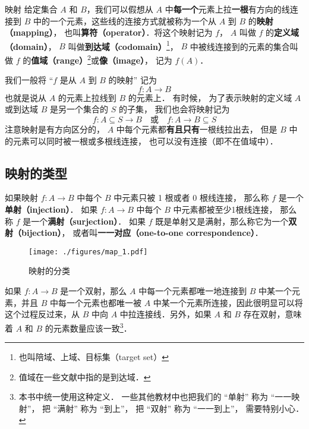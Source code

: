 

\begin{definition}{映射}
给定集合 $A$ 和 $B$，我们可以假想从 $A$ 中\textbf{每一个}元素上拉\textbf{一根}有方向的线连接到 $B$ 中的一个元素，这些线的连接方式就被称为一个从 $A$ 到 $B$ 的\textbf{映射（mapping）}， 也叫\textbf{算符（operator）}．将这个映射记为 $f$， $A$ 叫做 $f$ 的\textbf{定义域（domain）}， $B$ 叫做\textbf{到达域（codomain）}\footnote{也叫陪域、上域、目标集（target set）}， $B$ 中被线连接到的元素的集合叫做 $f$ 的\textbf{值域（range）}\footnote{值域在一些文献中指的是到达域．}或\textbf{像（image）}， 记为 $f(A)$．
\end{definition}

我们一般将 “$f$ 是从 $A$ 到 $B$ 的映射” 记为
\begin{equation}
f:A\to B
\end{equation}
也就是说从 $A$ 的元素上拉线到 $B$ 的元素上． 有时候， 为了表示映射的定义域 $A$ 或到达域 $B$ 是另一个集合的 $S$ 的子集， 我们也会将映射记为
\begin{equation}
f: A\subseteq S \to B \quad\text{或}\quad f: A \to B \subseteq S
\end{equation}
注意映射是有方向区分的， $A$ 中每个元素都\textbf{有且只有}一根线拉出去， 但是 $B$ 中的元素可以同时被一根或多根线连接， 也可以没有连接（即不在值域中）．

\subsection{映射的类型}
\begin{definition}{}\label{map_def1}
如果映射 $f:A \to B$ 中每个 $B$ 中元素只被 1 根或者 0 根线连接， 那么称 $f$ 是一个\textbf{单射（injection）}． 如果 $f:A\to B$ 中每个 $B$ 中元素都被至少1根线连接， 那么称 $f$ 是一个\textbf{满射（surjection）}． 如果 $f$ 既是单射又是满射，那么称它为一个\textbf{双射（bijection）}， 或者叫\textbf{一一对应（one-to-one correspondence）}．
\end{definition}

\begin{figure}[ht]
\centering
\texttt{[image: ./figures/map\_1.pdf]}
\caption{映射的分类} \label{map_fig1}
\end{figure}

如果 $f:A\to B$ 是一个双射，那么 $A$ 中每一个元素都唯一地连接到 $B$ 中某一个元素，并且 $B$ 中每一个元素也都唯一被 $A$ 中某一个元素所连接，因此很明显可以将这个过程反过来，从 $B$ 中向 $A$ 中拉连接线．另外，如果 $A$ 和 $B$ 存在双射，意味着 $A$ 和 $B$ 的元素数量应该一致\footnote{本书中统一使用这种定义． 一些其他教材中也把我们的 “单射” 称为 “一一映射”， 把 “满射” 称为 “到上”， 把 “双射” 称为 “一一到上”， 需要特别小心．}．

